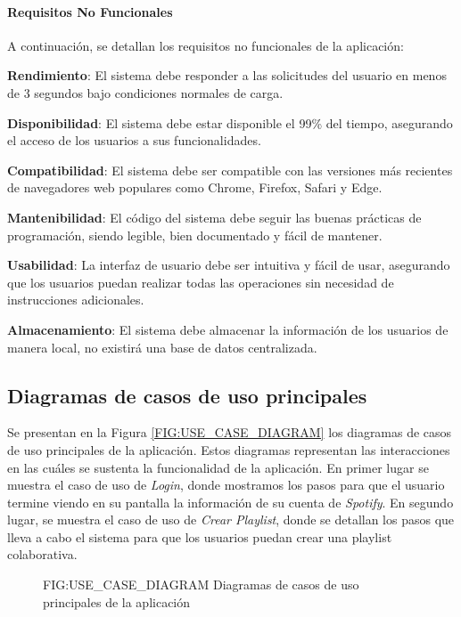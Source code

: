 \paragraph{\textbf{Requisitos No Funcionales}}

A continuación, se detallan los requisitos no funcionales de la aplicación:

\begin{nonfunctional}
    \item \textbf{Rendimiento}: El sistema debe responder a las solicitudes del usuario en menos de 3 segundos bajo condiciones normales de carga.
    \item \textbf{Disponibilidad}: El sistema debe estar disponible el 99\% del tiempo, asegurando el acceso de los usuarios a sus funcionalidades.
    \item \textbf{Compatibilidad}: El sistema debe ser compatible con las versiones más recientes de navegadores web populares como Chrome, Firefox, Safari y Edge.
    \item \textbf{Mantenibilidad}: El código del sistema debe seguir las buenas prácticas de programación, siendo legible, bien documentado y fácil de mantener.
    \item \textbf{Usabilidad}: La interfaz de usuario debe ser intuitiva y fácil de usar, asegurando que los usuarios puedan realizar todas las operaciones sin necesidad de instrucciones adicionales.
    \item \textbf{Almacenamiento}: El sistema debe almacenar la información de los usuarios de manera local, no existirá una base de datos centralizada.
\end{nonfunctional}

\subsection{Diagramas de casos de uso principales\label{SEC:CASOS_USO}}

Se presentan en la Figura \ref{FIG:USE_CASE_DIAGRAM} los diagramas de casos de uso principales de la aplicación. Estos diagramas representan las interacciones en las cuáles
se sustenta la funcionalidad de la aplicación. En primer lugar se muestra el caso de uso de \textit{Login}, donde mostramos los pasos para que el usuario
termine viendo en su pantalla la información de su cuenta de \textit{Spotify}. En segundo lugar, se muestra el caso de uso de \textit{Crear Playlist}, donde se detallan los pasos
que lleva a cabo el sistema para que los usuarios puedan crear una playlist colaborativa. 


\begin{figure}[Diagramas de casos de uso principales de la aplicación]{FIG:USE_CASE_DIAGRAM}
    {Diagramas de casos de uso principales de la aplicación}
     \quad
\end{figure}

\newpage
